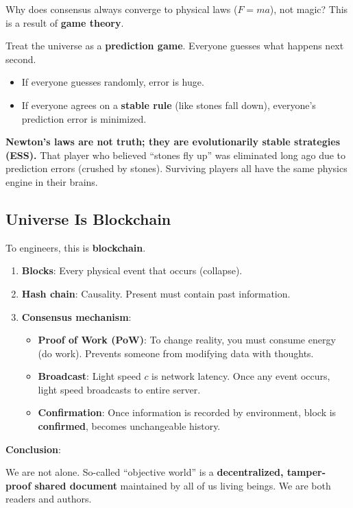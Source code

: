 Why does consensus always converge to physical laws ($F=ma$), not magic?
This is a result of \textbf{game theory}.

Treat the universe as a \textbf{prediction game}. Everyone guesses what happens next second.
\begin{itemize}
\item If everyone guesses randomly, error is huge.
\item If everyone agrees on a \textbf{stable rule} (like stones fall down), everyone's prediction error is minimized.
\end{itemize}

\textbf{Newton's laws are not truth; they are evolutionarily stable strategies (ESS).}
That player who believed ``stones fly up'' was eliminated long ago due to prediction errors (crushed by stones). Surviving players all have the same physics engine in their brains.

\subsection{Universe Is Blockchain}

To engineers, this is \textbf{blockchain}.

\begin{enumerate}
\item \textbf{Blocks}: Every physical event that occurs (collapse).
\item \textbf{Hash chain}: Causality. Present must contain past information.
\item \textbf{Consensus mechanism}:
\begin{itemize}
\item \textbf{Proof of Work (PoW)}: To change reality, you must consume energy (do work). Prevents someone from modifying data with thoughts.
\item \textbf{Broadcast}: Light speed $c$ is network latency. Once any event occurs, light speed broadcasts to entire server.
\item \textbf{Confirmation}: Once information is recorded by environment, block is \textbf{confirmed}, becomes unchangeable history.
\end{itemize}
\end{enumerate}

\textbf{Conclusion}:

We are not alone.
So-called ``objective world'' is a \textbf{decentralized, tamper-proof shared document} maintained by all of us living beings. We are both readers and authors.
